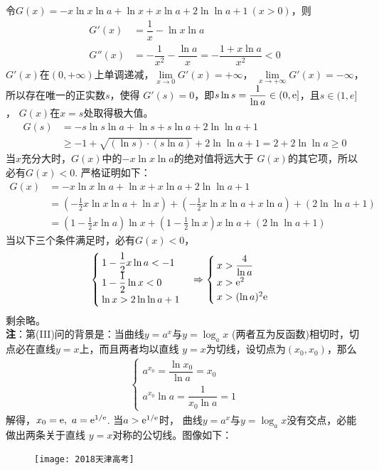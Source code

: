 \begin{enumerate}[label={【\textbf{例\thechapter.\arabic*}】},
 leftmargin=\inteval{\myenumleftmargin}pt,
 itemsep=\inteval{\myenumitempsep}pt,
 itemindent=\inteval{\myenumitemindent}pt]
令$ G(x)=-x\ln x\ln a+\ln x +x\ln a+2\ln\ln a+1\ (x>0) $，则
\begin{align*}
    G'(x)&=\dfrac{1}{x}-\ln x\ln a \\
    G''(x)&=-\dfrac{1}{x^2}-\dfrac{\ln a}{x}=-\dfrac{1+x\ln a}{x^2}<0
\end{align*}
$ G'(x) $在$ (0,+\infty) $上单调递减，$ \lim\limits_{x\to 0}G'(x)= +\infty $，
$ \lim\limits_{x\to +\infty}G'(x)= -\infty $，所以存在唯一的正实数$ s $，使得
$ G'(s)=0 $，即$ s\ln s=\dfrac{1}{\ln a}\in(0,\mathrm{e}] $，且$ s\in (1,e] $，
$ G(x) $在$ x=s $处取得极大值。
\begin{align*}
    G(s)&=-s\ln s\ln a+\ln s +s\ln a+2\ln\ln a+1 \\
    &\geq -1+\sqrt{(\ln s)\cdot (s\ln a)}+2\ln\ln a+1=2+2\ln\ln a\geq 0
\end{align*}
当$ x $充分大时，$ G(x) $中的$ -x\ln x\ln a $的绝对值将远大于
$ G(x) $的其它项，所以必有$ G(x)<0 $. 严格证明如下：
\begin{align*}
    G(x) &= -x\ln x\ln a+\ln x +x\ln a+2\ln\ln a+1 \\
    &=\left(-\frac{1}{2}x\ln x\ln a+\ln x\right)+
    \left(-\frac{1}{2}x\ln x\ln a+x\ln a\right)+(2\ln\ln a+1) \\
    &=\left(1-\frac{1}{2}x\ln a\right)\ln x+
    \left(1-\frac{1}{2}\ln x\right)x\ln a+(2\ln\ln a+1) 
\end{align*}
当以下三个条件满足时，必有$ G(x)<0 $，
\begin{gather*}
    \begin{cases}
        1-\dfrac{1}{2}x\ln a < -1 \\
        1-\dfrac{1}{2}\ln x <0 \\
        \ln x>2\ln\ln a+1
    \end{cases} \Rightarrow 
    \begin{cases}
        x> \dfrac{4}{\ln a} \\
        x>\mathrm{e}^2 \\
        x>(\ln a)^2\mathrm{e}
    \end{cases}
\end{gather*}
剩余略。\\
\textbf{注}：第(III)问的背景是：当曲线$ y=a^x $与$ y=\log_a x $
(两者互为反函数)相切时，切点必在直线$ y=x $上，而且两者均以直线
$ y=x $为切线，设切点为$ (x_0,x_0) $，那么
\begin{align*}
    \begin{cases}
        a^{x_0}=\dfrac{\ln x_0}{\ln a}=x_0 \\
        a^{x_0}\ln a=\dfrac{1}{x_0\ln a}=1
    \end{cases}
\end{align*}
解得，$ x_0=\mathrm{e},\ a=\mathrm{e}^{1/\mathrm{e}} $. 当$ a>\mathrm{e}^{1/\mathrm{e}} $时，
曲线$ y=a^x $与$ y=\log_a x $没有交点，必能做出两条关于直线
$ y=x $对称的公切线。图像如下：
\begin{figure}[H]
    \centering
    \texttt{[image: 2018天津高考]}
\end{figure}


\end{enumerate}
